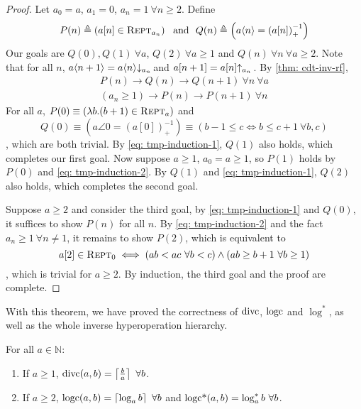 \begin{proof}
Let $a_0 = a$, $a_1 = 0$, $a_n = 1 \ \forall n\ge 2$. Define
\begin{equation*}
P(n) \triangleq  \left(a[n] \in \text{\scshape{Rept}}_{a_n}\right)\ \text{ and } \
Q(n) \triangleq  \left(a\langle n\rangle = \left(a[n]\right)^{-1}_+ \right)
\end{equation*}
Our goals are $Q(0), Q(1) \ \forall a$, $Q(2) \ \forall a\ge 1$ and $Q(n) \ \forall n \ \forall a\ge 2$. Note that for all $n$, $a\angle{n+1} = \cdt{a\angle{n}}{a_n}$ and $a[n+1] = \rf{a[n]}{a_n}\ $. By \cref{thm: cdt-inv-rf},
\begin{align}
P(n) \to Q(n) \to Q(n+1) \ \forall n \ \forall a \label{eq: tmp-induction-1} \\
(a_n\ge 1) \to P(n) \to P(n+1) \ \forall n \label{eq: tmp-induction-2}
\end{align}
For all $a$, $P(0) \equiv \left(\lambda b.(b+1)\in \text{\scshape{Rept}}_a \right)$ and
\begin{equation*}
Q(0) \equiv \left(a\angle{0} = \left(a[0]\right)^{-1}_+\right) \equiv \left(b-1\le c \iff b\le c+1 \ \forall b, c \right)
\end{equation*}
, which are both trivial. By \eqref{eq: tmp-induction-1}, $Q(1)$ also holds, which completes our first goal. Now suppose $a\ge 1$, $a_0 = a\ge 1$, so $P(1)$ holds by $P(0)$ and \eqref{eq: tmp-induction-2}. By $Q(1)$ and \eqref{eq: tmp-induction-1}, $Q(2)$ also holds, which completes the second goal.

Suppose $a\ge 2$ and consider the third goal, by \eqref{eq: tmp-induction-1} and $Q(0)$, it suffices to show $P(n)$ for all $n$. By \eqref{eq: tmp-induction-2} and the fact $a_n\ge 1 \ \forall n\neq 1$, it remains to show $P(2)$, which is equivalent to
\begin{equation*}
a[2]\in \repeatable_0 \iff (ab < ac \ \forall b < c) \wedge (ab \ge b+1 \ \forall b\ge 1)
\end{equation*}
, which is trivial for $a\ge 2$. By induction, the third goal and the proof are complete.
\end{proof}
With this theorem, we have proved the correctness of $\text{divc}$, $\text{logc}$ and $\log^*$, as well as the whole inverse hyperoperation hierarchy.
\begin{col}
	For all $a \in\mathbb{N}$:
	\begin{enumerate}
		\item If $a\ge 1$, $\text{divc}(a, b) = \left\lceil \frac{b}{a} \right\rceil \ \forall b$.
		\item If $a\ge 2$, $\text{logc}(a, b) = \left\lceil \log_ab \right\rceil \ \forall b$ and $\text{logc*}(a, b) = \log^*_ab \ \forall b$.
	\end{enumerate}
\end{col}
